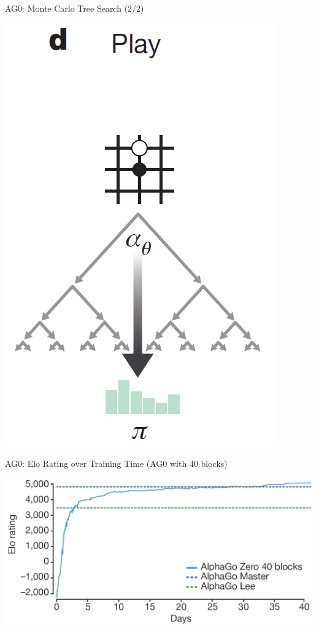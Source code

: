 \documentclass{beamer}
\begin{document}
{    \begin{frame}{AG0: Monte Carlo Tree Search (2/2)}
      \begin{center}
        \includegraphics[height=.85\textheight]{../img/AG0-paper/MCTS-2.png}
      \end{center}
    \end{frame}

    \begin{frame}{AG0: Elo Rating over Training Time (AG0 with 40 blocks)}
      \begin{center}
        \includegraphics[width=\textwidth]{../img/AG0-paper/AG0-40-elo-vs-training-days.png}
      \end{center}
    \end{frame}

}
\end{document}
